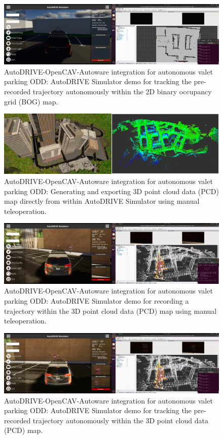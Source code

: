 \begin{figure}[H]
    \centering
    \includegraphics[width=\linewidth]{Figures/fig33.png}
    \caption{AutoDRIVE-OpenCAV-Autoware integration for autonomous valet parking ODD: AutoDRIVE Simulator demo for tracking the pre-recorded trajectory autonomously within the 2D binary occupancy grid (BOG) map.}
    \label{fig: figure33}
\end{figure}

\begin{figure}[H]
    \centering
    \includegraphics[width=\linewidth]{Figures/fig34.png}
    \caption{AutoDRIVE-OpenCAV-Autoware integration for autonomous valet parking ODD: Generating and exporting 3D point cloud data (PCD) map directly from within AutoDRIVE Simulator using manual teleoperation.}
    \label{fig: figure34}
\end{figure}

\begin{figure}[H]
    \centering
    \includegraphics[width=\linewidth]{Figures/fig35.png}
    \caption{AutoDRIVE-OpenCAV-Autoware integration for autonomous valet parking ODD: AutoDRIVE Simulator demo for recording a trajectory within the 3D point cloud data (PCD) map using manual teleoperation.}
    \label{fig: figure35}
\end{figure}

\begin{figure}[H]
    \centering
    \includegraphics[width=\linewidth]{Figures/fig36.png}
    \caption{AutoDRIVE-OpenCAV-Autoware integration for autonomous valet parking ODD: AutoDRIVE Simulator demo for tracking the pre-recorded trajectory autonomously within the 3D point cloud data (PCD) map.}
    \label{fig: figure36}
\end{figure}